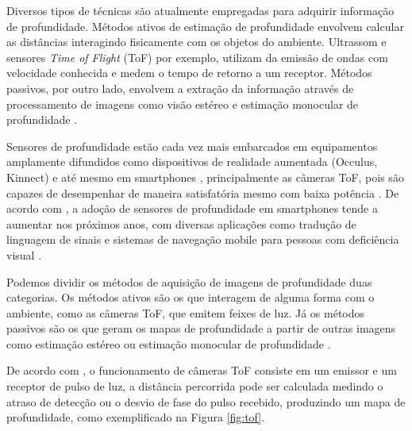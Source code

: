 Diversos tipos de técnicas são atualmente empregadas para adquirir informação de profundidade. Métodos ativos de estimação de profundidade envolvem calcular as distâncias interagindo fisicamente com os objetos do ambiente. Ultrassom e sensores \textit{Time of Flight} (ToF) por exemplo, utilizam da emissão de ondas com velocidade conhecida e medem o tempo de retorno a um receptor. Métodos passivos, por outro lado, envolvem a extração da informação através de processamento de imagens como visão estéreo e estimação monocular de profundidade \cite{khan2020deep}. 


Sensores de profundidade estão cada vez mais embarcados em equipamentos amplamente difundidos como dispositivos de realidade aumentada (Occulus, Kinnect) e até mesmo em smartphones \cite{du2020depthlab}, principalmente as câmeras ToF, pois são capazes de desempenhar de maneira satisfatória mesmo com baixa potência \cite{branscombe2018microsoft}. De acordo com \cite{xie2021ultradepth}, a adoção de sensores de profundidade em smartphones tende a aumentar nos próximos anos, com diversas aplicações como tradução de linguagem de sinais \cite{park2021enabling} e sistemas de navegação mobile para pessoas com deficiência visual \cite{see2022smartphone}.

Podemos dividir os métodos de aquisição de imagens de profundidade duas categorias. Os métodos ativos são os que interagem de alguma forma com o ambiente, como as câmeras ToF, que emitem feixes de luz. Já os métodos passivos são os que geram os mapas de profundidade a partir de outras imagens como estimação estéreo ou estimação monocular de profundidade \cite{lahiri2024deep} \cite{zollhofer2019commodity}. 

De acordo com , o funcionamento de câmeras ToF consiste em um emissor e um receptor de pulso de luz, a distância percorrida pode ser calculada medindo o atraso de detecção ou o desvio de fase do pulso recebido, produzindo um mapa de profundidade, como exemplificado na Figura \ref{fig:tof}. 

